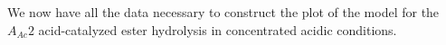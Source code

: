 \documentclass[]{tufte-handout}
\begin{document}
\begin{table}[h!]
\begin{tabular}{SSSSS}
    \end{tabular}
\end{table}
\vspace{5mm}
We now have all the data necessary to construct the plot of the model for the $A_{Ac}2$ acid-catalyzed ester hydrolysis in concentrated acidic conditions.
\end{document}
